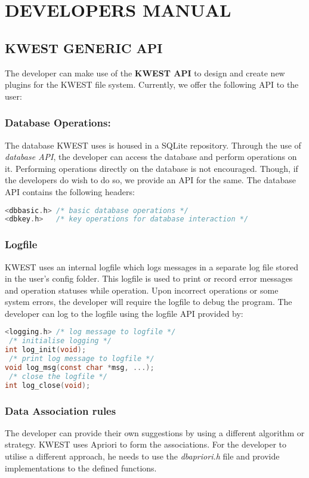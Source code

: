 \newpage

\setcounter{section}{0}
\chapter*{DEVELOPERS MANUAL}

\section {KWEST GENERIC API}
The developer can make use of the \textbf{KWEST API} to design and create new plugins for the KWEST file system. Currently, we offer the following API to the user:

\subsection{Database Operations:}
The database KWEST uses is housed in a SQLite repository. Through the use of \textit{database API}, the developer can access the database and perform operations on it. Performing operations directly on the database is not encouraged. Though, if the developers do wish to do so, we provide an API for the same. The database API contains the following headers:
\begin{lstlisting}[language=C,frame=single]
<dbbasic.h> /* basic database operations */
<dbkey.h>   /* key operations for database interaction */
\end{lstlisting}

\subsection{Logfile}
KWEST uses an internal logfile which logs messages in a separate log file stored in the user's config folder. This logfile is used to print or record error messages and operation statuses while operation. Upon incorrect operations or some system errors, the developer will require the logfile to debug the program. The developer can log to the logfile using the logfile API provided by:
\begin{lstlisting}[language=C,frame=single]
<logging.h> /* log message to logfile */
 /* initialise logging */
int log_init(void); 
 /* print log message to logfile */
void log_msg(const char *msg, ...); 
 /* close the logfile */
int log_close(void);
\end{lstlisting}

\subsection{Data Association rules}
The developer can provide their own suggestions by using a different algorithm or strategy. KWEST uses Apriori to form the associations. For the developer to utilise a different approach, he needs to use the \textit{dbapriori.h} file and provide implementations to the defined functions.

